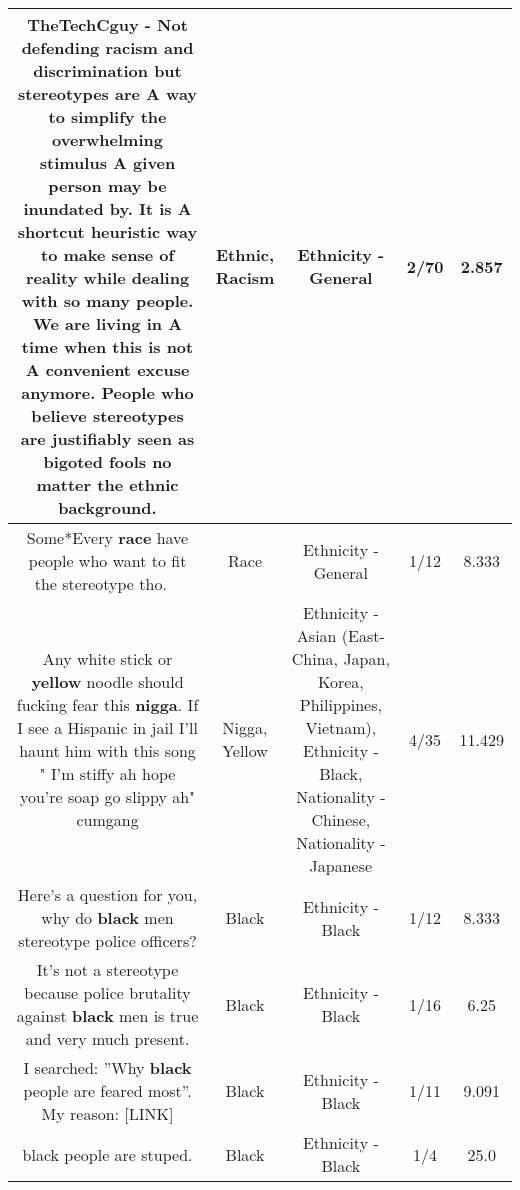 \documentclass[11pt]{article}
\newlength\mylength
\begin{document}
\begin{center}
\begin{longtable}{|C{.65\mylength}|C{.30\mylength}|C{.12\mylength}|C{.12\mylength}|C{.12\mylength}|}
  \small TheTechCguy - Not defending \textbf{racism} and discrimination but stereotypes are A way to simplify the overwhelming stimulus A given person may be inundated by. It is A shortcut heuristic way to make sense of reality while dealing with so many people. We are living in A time when this is not A convenient excuse anymore. People who believe stereotypes are justifiably seen as bigoted fools no matter the \textbf{ethnic} background.\normalsize   & Ethnic, Racism & Ethnicity - General & 2/70 & 2.857 \\  \hline
  \small Some*Every \textbf{race} have people who want to fit the stereotype tho.🤷🏾‍♂️\normalsize   & Race & Ethnicity - General & 1/12 & 8.333 \\  \hline
  \small Any white stick or \textbf{y\textbf{e\textbf{llow}}} noodle should fucking fear this \textbf{nigga}. If I see a Hispanic in jail I'll haunt him with this song " I'm stiffy ah hope you're soap go slippy ah" cumgang\normalsize   & Nigga, Yellow & Ethnicity - Asian (East- China, Japan, Korea, Philippines, Vietnam), Ethnicity - Black, Nationality - Chinese, Nationality - Japanese & 4/35 & 11.429 \\  \hline
  \small Here's a question for you, why do \textbf{black} men stereotype police officers?\normalsize   & Black & Ethnicity - Black & 1/12 & 8.333 \\  \hline
  \small It's not a stereotype because police brutality against \textbf{black} men is true and very much present.\normalsize   & Black & Ethnicity - Black & 1/16 & 6.25 \\  \hline
  \small I searched: ''Why \textbf{black} people are feared most''. My reason:  [LINK] \normalsize   & Black & Ethnicity - Black & 1/11 & 9.091 \\  \hline
  \small black people are stuped.\normalsize   & Black & Ethnicity - Black & 1/4 & 25.0 \\  \hline

\end{longtable}
\end{center}
\end{document}
